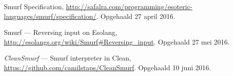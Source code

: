 \begin{thebibliography}{9}
	 Smurf Specification,
	\url{http://safalra.com/programming/esoteric-languages/smurf/specification/}.
	Opgehaald 27 april 2016.

	 Smurf --- Reversing input on Esolang,
	\url{http://esolangs.org/wiki/Smurf#Reversing_input}. Opgehaald 27 mei 2016.

	 \emph{CleanSmurf} --- Smurf interpreter in Clean,
	\url{https://github.com/camilstaps/CleanSmurf}. Opgehaald 10 juni 2016.
\end{thebibliography}

